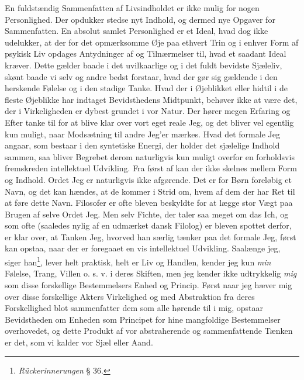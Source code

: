\documentclass[12pt]{article}
\newcommand{\opage}[1]{\marginnote{\footnotesize\textit{[#1]}}}
\begin{document}
En fuldstændig Sammenfatten af Livsindholdet er ikke mulig for nogen
Personlighed. Der opdukker stedse nyt Indhold, og dermed nye Opgaver
for Sammenfatten. En absolut samlet Personlighed er et Ideal, hvad dog
ikke udelukker, at der for det opmærksomme Øje paa ethvert Trin og i
enhver Form af psykisk Liv opdages Antydninger af og Tilnærmelser til,
hvad et saadant Ideal kræver. Dette gælder baade i det uvilkaarlige og
i det fuldt bevidste Sjæleliv, skønt baade vi selv og andre bedst
forstaar, hvad der gør sig gældende i den herskende Følelse og i den
stadige Tanke. Hvad der i Øjeblikket eller hidtil i de fleste Øjeblikke
har indtaget Bevidsthedens Midtpunkt, behøver ikke at være det, der i
Virkeligheden er dybest grundet i vor Natur. Der hører megen Erfaring
og Efter%
\setcounter{footnote}{0}%
\opage{40}tanke til for at blive klar over vort eget reale Jeg, og det
bliver vel egentlig kun muligt, naar Modsætning til andre Jeg'er
mærkes. Hvad det formale Jeg angaar, som bestaar i den syntetiske
Energi, der holder det sjælelige Indhold sammen, saa bliver Begrebet
derom naturligvis kun muligt overfor en forholdsvis fremskreden
intellektuel Udvikling. Fra først af kan der ikke skelnes mellem Form
og Indhold. Ordet Jeg er naturligvis ikke afgørende. Det er for Børn
foreløbig et Navn, og det kan hændes, at de kommer i Strid om, hvem af
dem der har Ret til at føre dette Navn. Filosofer er ofte bleven
beskyldte for at lægge stor Vægt paa Brugen af selve Ordet Jeg. Men
selv Fichte, der taler saa meget om \guillemotright{}das Ich\guillemotleft{},
og som ofte (saaledes nylig af en udmærket dansk Filolog) er bleven
spottet derfor, er klar over, at Tanken \guillemotright{}Jeg\guillemotleft{},
hvorved han særlig tænker paa det formale Jeg, først kan opstaa, naar
der er foregaaet en vis intellektuel Udvikling.
\guillemotright{}Saalænge jeg\guillemotleft{}, siger han\footnote{\textit{Rückerinnerungen}
§ 36.}, \guillemotright{}lever helt praktisk, helt er Liv og Handlen,
kender jeg kun \emph{min} Følelse, Trang, Villen o. s. v. i deres
Skiften, men jeg kender ikke udtrykkelig \emph{mig} som disse
forskellige Bestemmelsers Enhed og Princip. Først naar jeg hæver mig
over disse forskellige Akters Virkelighed og med Abstraktion fra deres
Forskellighed blot sammenfatter dem som alle hørende til i mig, opstaar
Bevidstheden om Enheden som Principet for hine mangfoldige
Bestemmelser overhovedet, og dette Produkt af vor abstraherende og
sammenfattende Tænken er det, som vi kalder vor Sjæl eller
Aand.\guillemotleft{}
\end{document}

